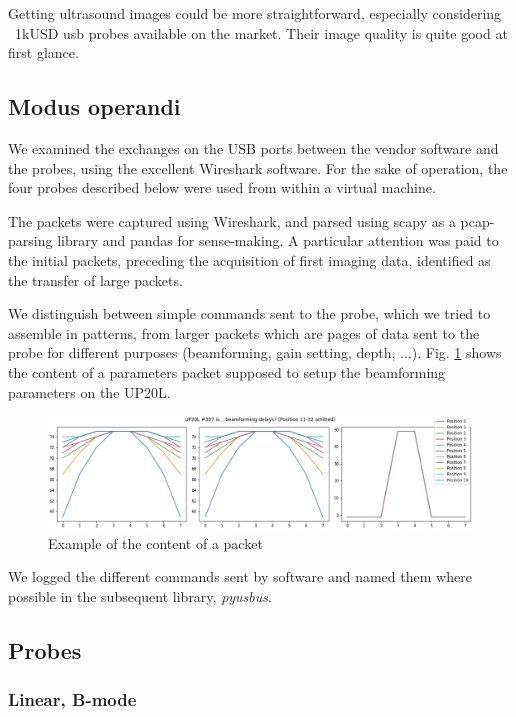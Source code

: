 \documentclass{article}
\begin{document}
Getting ultrasound images could be more straightforward, especially considering ~1kUSD usb probes available on the market. Their image quality is quite good at first glance.

\subsection{Modus operandi}

We examined the exchanges on the USB ports between the vendor software and the probes, using the excellent Wireshark software. For the sake of operation, the four probes described below were used from within a virtual machine. 

The packets were captured using Wireshark, and parsed using scapy as a pcap-parsing library and pandas for sense-making. A particular attention was paid to the initial packets, preceding the acquisition of first imaging data, identified as the transfer of large packets.

We distinguish between simple commands sent to the probe, which we tried to assemble in patterns, from larger packets which are pages of data sent to the probe for different purposes (beamforming, gain setting, depth, ...). Fig. \ref{fig:Packet307_UP20L} shows the content of a parameters packet supposed to setup the beamforming parameters on the UP20L.

\begin{figure}[htp!]
  \centering
    \includegraphics[width=0.98\linewidth]{images/307.jpg}
    \caption{Example of the content of a packet}
    \label{fig:Packet307_UP20L}
  \end{figure}

We logged the different commands sent by software and named them where possible in the subsequent library, \emph{pyusbus}. 

\subsection{Probes}

\subsubsection{Linear, B-mode}
\end{document}
